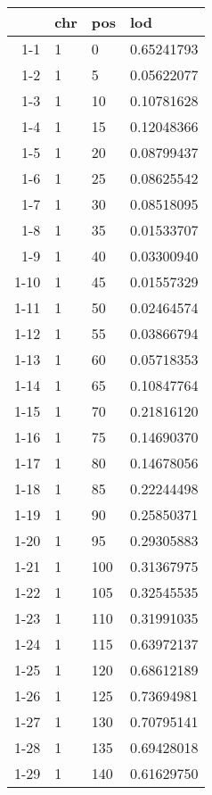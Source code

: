 \documentclass[11pt]{article}
\begin{document}
    \begin{tabular}{r|lll}
  & chr & pos & lod\\
\hline
	1-1 & 1          &   0        & 0.65241793\\
	1-2 & 1          &   5        & 0.05622077\\
	1-3 & 1          &  10        & 0.10781628\\
	1-4 & 1          &  15        & 0.12048366\\
	1-5 & 1          &  20        & 0.08799437\\
	1-6 & 1          &  25        & 0.08625542\\
	1-7 & 1          &  30        & 0.08518095\\
	1-8 & 1          &  35        & 0.01533707\\
	1-9 & 1          &  40        & 0.03300940\\
	1-10 & 1          &  45        & 0.01557329\\
	1-11 & 1          &  50        & 0.02464574\\
	1-12 & 1          &  55        & 0.03866794\\
	1-13 & 1          &  60        & 0.05718353\\
	1-14 & 1          &  65        & 0.10847764\\
	1-15 & 1          &  70        & 0.21816120\\
	1-16 & 1          &  75        & 0.14690370\\
	1-17 & 1          &  80        & 0.14678056\\
	1-18 & 1          &  85        & 0.22244498\\
	1-19 & 1          &  90        & 0.25850371\\
	1-20 & 1          &  95        & 0.29305883\\
	1-21 & 1          & 100        & 0.31367975\\
	1-22 & 1          & 105        & 0.32545535\\
	1-23 & 1          & 110        & 0.31991035\\
	1-24 & 1          & 115        & 0.63972137\\
	1-25 & 1          & 120        & 0.68612189\\
	1-26 & 1          & 125        & 0.73694981\\
	1-27 & 1          & 130        & 0.70795141\\
	1-28 & 1          & 135        & 0.69428018\\
	1-29 & 1          & 140        & 0.61629750\\

\end{tabular}
\end{document}
